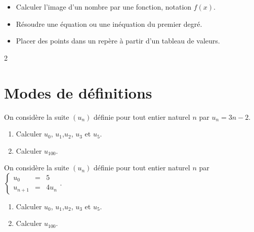 \documentclass[10pt,a4paper]{article}
\begin{document}

\vspace{-0.3cm}

\begin{prerequis}
\begin{itemize}
    \item Calculer l'image d'un nombre par une fonction, notation \(f(x)\).
    \item Résoudre une équation ou une inéquation du premier degré.
    \item Placer des points dans un repère à partir d'un tableau de valeurs.
\end{itemize}

\end{prerequis}

\begin{multicols}{2}

\section{Modes de définitions}

\begin{exo}

On considère la suite \((u_n)\) définie pour tout entier naturel \(n\) par \(u_n = 3n-2\).

\begin{enumerate}[leftmargin=*]
    \item Calculer \(u_0\), \(u_1\),\(u_2\), \(u_3\) et  \(u_5\).
    \item Calculer \(u_{100}\).
\end{enumerate}
\end{exo}

\begin{exo}

On considère la suite \((u_n)\) définie pour tout entier naturel \(n\) par \(\left\{\begin{array}{rcl}
u_0 &= & 5  \\
u_{n+1} & = & 4u_n
\end{array}
\right.\).

\begin{enumerate}[leftmargin=*]
    \item Calculer \(u_0\), \(u_1\),\(u_2\), \(u_3\) et  \(u_5\).
    \item Calculer \(u_{100}\).
\end{enumerate}
\end{exo}


\end{multicols}
\end{document}
